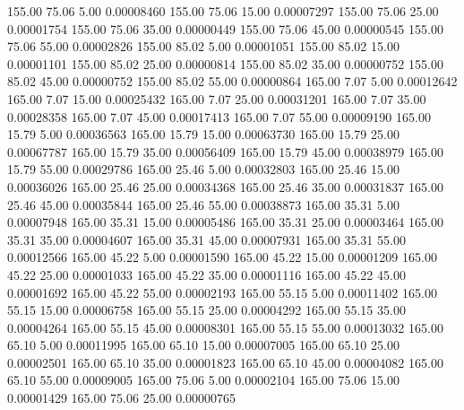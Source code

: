     155.00     75.06      5.00     0.00008460
    155.00     75.06     15.00     0.00007297
    155.00     75.06     25.00     0.00001754
    155.00     75.06     35.00     0.00000449
    155.00     75.06     45.00     0.00000545
    155.00     75.06     55.00     0.00002826
    155.00     85.02      5.00     0.00001051
    155.00     85.02     15.00     0.00001101
    155.00     85.02     25.00     0.00000814
    155.00     85.02     35.00     0.00000752
    155.00     85.02     45.00     0.00000752
    155.00     85.02     55.00     0.00000864
    165.00      7.07      5.00     0.00012642
    165.00      7.07     15.00     0.00025432
    165.00      7.07     25.00     0.00031201
    165.00      7.07     35.00     0.00028358
    165.00      7.07     45.00     0.00017413
    165.00      7.07     55.00     0.00009190
    165.00     15.79      5.00     0.00036563
    165.00     15.79     15.00     0.00063730
    165.00     15.79     25.00     0.00067787
    165.00     15.79     35.00     0.00056409
    165.00     15.79     45.00     0.00038979
    165.00     15.79     55.00     0.00029786
    165.00     25.46      5.00     0.00032803
    165.00     25.46     15.00     0.00036026
    165.00     25.46     25.00     0.00034368
    165.00     25.46     35.00     0.00031837
    165.00     25.46     45.00     0.00035844
    165.00     25.46     55.00     0.00038873
    165.00     35.31      5.00     0.00007948
    165.00     35.31     15.00     0.00005486
    165.00     35.31     25.00     0.00003464
    165.00     35.31     35.00     0.00004607
    165.00     35.31     45.00     0.00007931
    165.00     35.31     55.00     0.00012566
    165.00     45.22      5.00     0.00001590
    165.00     45.22     15.00     0.00001209
    165.00     45.22     25.00     0.00001033
    165.00     45.22     35.00     0.00001116
    165.00     45.22     45.00     0.00001692
    165.00     45.22     55.00     0.00002193
    165.00     55.15      5.00     0.00011402
    165.00     55.15     15.00     0.00006758
    165.00     55.15     25.00     0.00004292
    165.00     55.15     35.00     0.00004264
    165.00     55.15     45.00     0.00008301
    165.00     55.15     55.00     0.00013032
    165.00     65.10      5.00     0.00011995
    165.00     65.10     15.00     0.00007005
    165.00     65.10     25.00     0.00002501
    165.00     65.10     35.00     0.00001823
    165.00     65.10     45.00     0.00004082
    165.00     65.10     55.00     0.00009005
    165.00     75.06      5.00     0.00002104
    165.00     75.06     15.00     0.00001429
    165.00     75.06     25.00     0.00000765
